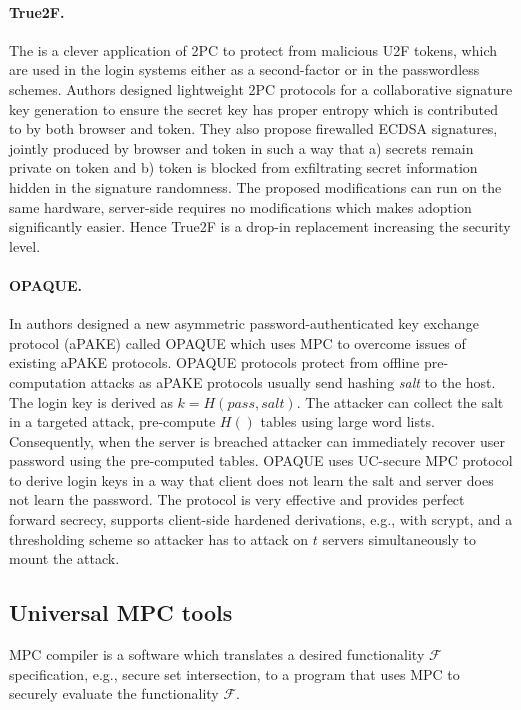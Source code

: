 \documentclass[
  digital, %
  twoside, %
  table,   %
  lof,     %
  lot,     %
]{fithesis3}
\begin{document}
\paragraph{True2F.} The \cite{DCMBR18} is a clever application of 2PC to protect from malicious U2F tokens, which are used in the login systems either as a second-factor or in the passwordless schemes. 
Authors designed lightweight 2PC protocols for a collaborative signature key generation to ensure the secret key has proper entropy which is contributed to by both browser and token. They also propose firewalled ECDSA signatures, jointly produced by browser and token in such a way that a) secrets remain private on token and b) token is blocked from exfiltrating secret information hidden in the signature randomness.
The proposed modifications can run on the same hardware, server-side requires no modifications which makes adoption significantly easier. Hence True2F is a drop-in replacement increasing the security level.
    
\paragraph{OPAQUE.} In \cite{JKX18} authors designed a new asymmetric password-authenticated key exchange protocol (aPAKE) called OPAQUE which uses MPC to overcome issues of existing aPAKE protocols.
OPAQUE protocols protect from offline pre-computation attacks as aPAKE protocols usually send hashing \emph{salt} to the host. 
The login key is derived as $k=H(pass, salt)$. The attacker can collect the salt in a targeted attack, pre-compute $H()$ tables using large word lists. Consequently, when the server is breached attacker can immediately recover user password using the pre-computed tables. OPAQUE uses UC-secure MPC protocol to derive login keys in a way that client does not learn the salt and server does not learn the password. The protocol is very effective and provides perfect forward secrecy, supports client-side hardened derivations, e.g., with scrypt, and a thresholding scheme so attacker has to attack on $t$ servers simultaneously to mount the attack.

\subsection{Universal MPC tools}
MPC compiler is a software which translates a desired functionality $\mathcal{F}$ specification, e.g., secure set intersection, to a program that uses MPC to securely evaluate the functionality $\mathcal{F}$.
\end{document}

